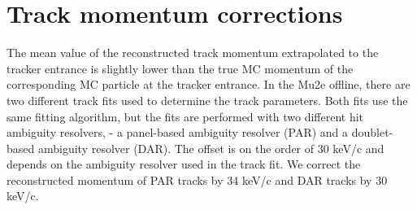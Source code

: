 \section{Track momentum corrections}

The mean value of the reconstructed track momentum extrapolated to the tracker entrance is
slightly lower than the true MC momentum of the corresponding MC particle at the tracker entrance.
%
In the Mu2e offline, there are two different track fits used to determine the track parameters.
Both fits use the same fitting algorithm, but the fits are performed with two different
hit ambiguity resolvers, - a panel-based ambiguity resolver (PAR) and a doublet-based
ambiguity resolver (DAR).
%
The offset is on the order of 30 keV/c and depends on the ambiguity resolver used in the track fit.
We correct the reconstructed momentum of PAR tracks by 34 keV/c and DAR tracks by 30 keV/c.



